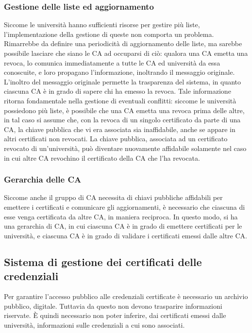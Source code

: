 \documentclass[a4paper,12pt]{article}
\begin{document}
\subsubsection{Gestione delle liste ed aggiornamento} Siccome le università hanno sufficienti risorse per gestire più liste, l'implementazione della gestione di queste non comporta un problema. Rimarrebbe da definire una periodicità di aggiornamento delle liste, ma sarebbe possibile lasciare che siano le CA ad occuparsi di ciò: qualora una CA emetta una revoca, lo comunica immediatamente a tutte le CA ed università da essa conoscuite, e loro propagano l'informazione, inoltrando il messaggio originale.
\newline L'inoltro del messaggio originale permette la trasparenza del sistema, in quanto ciascuna CA è in grado di sapere chi ha emesso la revoca. Tale informazione ritorna fondamentale nella gestione di eventuali conflitti: siccome le università possiedono più liste, è possibile che una CA emetta una revoca prima delle altre, in tal caso si assume che, con la revoca di un singolo certificato da parte di una CA, la chiave pubblica che vi era associata sia inaffidabile, anche se appare in altri certificati non revocati. La chiave pubblica, associata ad un certificato revocato di un'università, può diventare nuovamente affidabile solamente nel caso in cui altre CA revochino il certificato della CA che l'ha revocata.
\subsubsection{Gerarchia delle CA} Siccome anche il gruppo di CA necessita di chiavi pubbliche affidabili per emettere i certificati e comunicare gli aggiornamenti, è necessario che ciascuna di esse venga certificata da altre CA, in maniera reciproca. In questo modo, si ha una gerarchia di CA, in cui ciascuna CA è in grado di emettere certificati per le università, e ciascuna CA è in grado di validare i certificati emessi dalle altre CA.

\subsection{Sistema di gestione dei certificati delle credenziali}
Per garantire l'accesso pubblico alle credenziali certificate è necessario un archivio pubblico, digitale. Tuttavia da questo non devono trasparire informazioni riservate. È quindi necessario non poter inferire, dai certificati emessi dalle università, informazioni sulle credenziali a cui sono associati.
\end{document}
